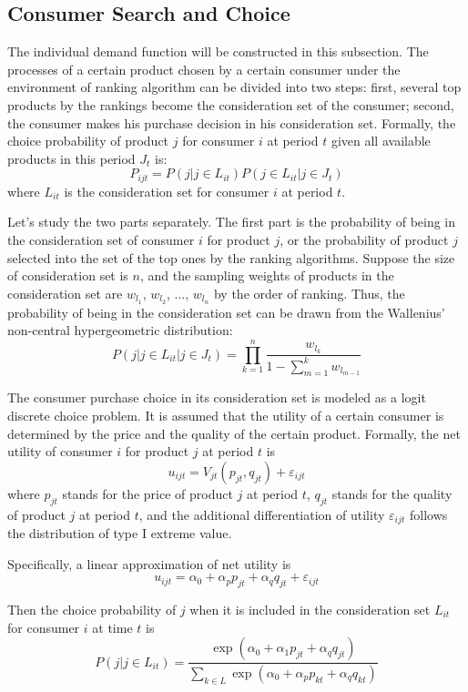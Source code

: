 \documentclass{article}
\begin{document}
\subsection{Consumer Search and Choice}

The individual demand function will be constructed in this subsection. The processes of a certain product chosen by a certain consumer under the environment of ranking algorithm can be divided into two steps: first, several top products by the rankings become the consideration set of the consumer; second, the consumer makes his purchase decision in his consideration set.  Formally, the choice probability of product $j$ for consumer $i$ at period $t$ given all available products in this period $J_t$ is:
$$
P_{ijt} = P(j|j\in L_{it})P(j \in L_{it}|j\in J_t)
$$
where $L_{it}$ is the consideration set for consumer $i$ at period $t$. 

Let's study the two parts separately. The first part is the probability of being in the consideration set of consumer $i$ for product $j$, or the probability of product $j$ selected into the set of the top ones by the ranking algorithms. Suppose the size of consideration set is $n$, and the sampling weights of products in the consideration set are $w_{l_1}$, $w_{l_2}$, ..., $w_{l_n}$ by the order of ranking. Thus, the probability of being in the consideration set can be drawn from the Wallenius' non-central hypergeometric distribution: 
$$
P(j|j \in L_{it}| j \in J_t) = \prod_{k=1}^{n}\frac{w_{l_k}}{1-\sum\limits_{m=1}^{k}w_{l_{m-1}}}
$$

The consumer purchase choice in its consideration set is modeled as a logit discrete choice problem.  It is assumed that the utility of a certain consumer is determined by the price and the quality of the certain product. Formally, the net utility of consumer $i$ for product $j$ at period $t$ is
$$
u_{ijt} = V_{jt}(p_{jt}, q_{jt})+\varepsilon_{ijt}
$$
where $p_{jt}$ stands for the price of product $j$ at period $t$, $q_{jt}$ stands for the quality of product $j$ at period $t$, and the additional differentiation of utility $\varepsilon_{ijt}$ follows the distribution of type I extreme value. 

Specifically, a linear approximation of net utility is 
$$
u_{ijt}=\alpha_0 + \alpha_p p_{jt} + \alpha_q q_{jt}+\varepsilon_{ijt}
$$

Then the choice probability of $j$ when it is included in the consideration set $L_{it}$ for consumer $i$ at time $t$ is  
$$
P(j|j\in L_{it}) = \frac{\exp(\alpha_0+\alpha_1 p_{jt}+\alpha_q q_{jt})}{\sum_{k \in L} \exp(\alpha_0+\alpha_p p_{kt}+\alpha_q q_{kt})}
$$
\end{document}
